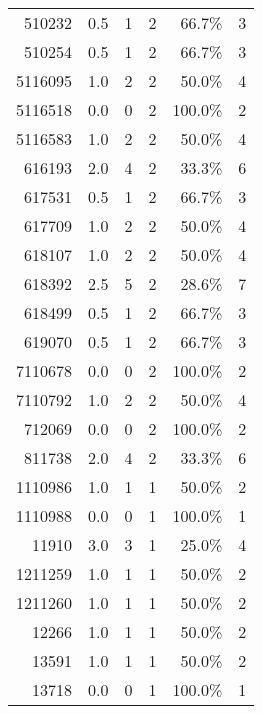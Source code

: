 \begin{longtable}{lrrrrr}
	\multicolumn{1}{r}{510232} & 0.5   & 1     & 2     & 66.7\% & 3 \\
	\multicolumn{1}{r}{510254} & 0.5   & 1     & 2     & 66.7\% & 3 \\
	\multicolumn{1}{r}{5116095} & 1.0   & 2     & 2     & 50.0\% & 4 \\
	\multicolumn{1}{r}{5116518} & 0.0   & 0     & 2     & 100.0\% & 2 \\
	\multicolumn{1}{r}{5116583} & 1.0   & 2     & 2     & 50.0\% & 4 \\
	\multicolumn{1}{r}{616193} & 2.0   & 4     & 2     & 33.3\% & 6 \\
	\multicolumn{1}{r}{617531} & 0.5   & 1     & 2     & 66.7\% & 3 \\
	\multicolumn{1}{r}{617709} & 1.0   & 2     & 2     & 50.0\% & 4 \\
	\multicolumn{1}{r}{618107} & 1.0   & 2     & 2     & 50.0\% & 4 \\
	\multicolumn{1}{r}{618392} & 2.5   & 5     & 2     & 28.6\% & 7 \\
	\multicolumn{1}{r}{618499} & 0.5   & 1     & 2     & 66.7\% & 3 \\
	\multicolumn{1}{r}{619070} & 0.5   & 1     & 2     & 66.7\% & 3 \\
	\multicolumn{1}{r}{7110678} & 0.0   & 0     & 2     & 100.0\% & 2 \\
	\multicolumn{1}{r}{7110792} & 1.0   & 2     & 2     & 50.0\% & 4 \\
	\multicolumn{1}{r}{712069} & 0.0   & 0     & 2     & 100.0\% & 2 \\
	\multicolumn{1}{r}{811738} & 2.0   & 4     & 2     & 33.3\% & 6 \\
	\multicolumn{1}{r}{1110986} & 1.0   & 1     & 1     & 50.0\% & 2 \\
	\multicolumn{1}{r}{1110988} & 0.0   & 0     & 1     & 100.0\% & 1 \\
	\multicolumn{1}{r}{11910} & 3.0   & 3     & 1     & 25.0\% & 4 \\
	\multicolumn{1}{r}{1211259} & 1.0   & 1     & 1     & 50.0\% & 2 \\
	\multicolumn{1}{r}{1211260} & 1.0   & 1     & 1     & 50.0\% & 2 \\
	\multicolumn{1}{r}{12266} & 1.0   & 1     & 1     & 50.0\% & 2 \\
	\multicolumn{1}{r}{13591} & 1.0   & 1     & 1     & 50.0\% & 2 \\
	\multicolumn{1}{r}{13718} & 0.0   & 0     & 1     & 100.0\% & 1 \\

\end{longtable}
